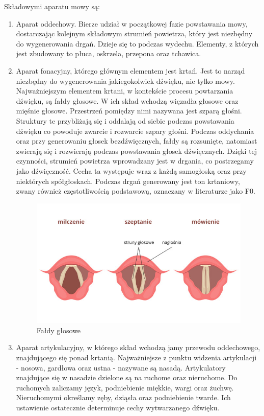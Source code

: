 \documentclass[a4paper,12 pt]{article}
\begin{document}
Składowymi aparatu mowy są:
\begin{enumerate}
\item Aparat oddechowy. Bierze udział w początkowej fazie powstawania mowy, dostarczając kolejnym składowym strumień powietrza, który jest niezbędny do wygenerowania drgań. Dzieje się to podczas wydechu. Elementy, z których jest zbudowany to płuca, oskrzela, przepona oraz tchawica.

\item Aparat fonacyjny, którego głównym elementem jest krtań. Jest to narząd niezbędny do wygenerowania jakiegokolwiek dźwięku, nie tylko mowy. Najważniejszym elementem krtani, w kontekście procesu powtarzania dźwięku, są fałdy głosowe. W ich skład wchodzą więzadła głosowe oraz mięśnie głosowe. Przestrzeń pomiędzy nimi nazywana jest szparą głośni. Struktury te przybliżają się i oddalają od siebie podczas powstawania dźwięku co powoduje zwarcie i rozwarcie szpary głośni. Podczas oddychania oraz przy generowaniu głosek bezdźwięcznych, fałdy są rozsunięte, natomiast zwierają się  i rozwierają podczas powstawania głosek dźwięcznych. 
Dzięki tej czynności, strumień powietrza wprowadzany jest w drgania, co postrzegamy jako dźwięczność. Cecha ta występuje wraz z każdą samogłoską oraz przy niektórych spółgłoskach. Podczas drgań generowany jest ton krtaniowy, zwany również częstotliwością podstawową, oznaczany w literaturze jako F0. 
\begin{figure}[!htbp]

\centering
\includegraphics[scale=0.5]{faldy_glosowe}
\caption{Fałdy głosowe ~\cite{krtan}}

\end{figure}
\FloatBarrier


\item Aparat artykulacyjny, w którego skład wchodzą jamy przewodu oddechowego, znajdującego się ponad krtanią. Najważniejsze z punktu widzenia artykulacji - nosowa, gardłowa oraz ustna - nazywane są nasadą. Artykulatory znajdujące się w nasadzie dzielone są na ruchome oraz nieruchome. Do ruchomych zaliczamy język, podniebienie miękkie, wargi oraz żuchwę. Nieruchomymi określamy zęby, dziąsła oraz podniebienie twarde. Ich ustawienie ostatecznie determinuje cechy wytwarzanego dźwięku. 
\end{enumerate}
\end{document}
